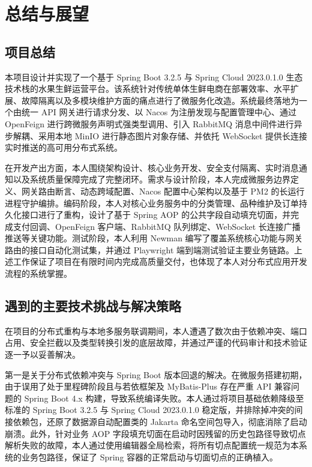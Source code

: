
\chapter{总结与展望}

\section{项目总结}

本项目设计并实现了一个基于 Spring Boot 3.2.5 与 Spring Cloud 2023.0.1.0 生态技术栈的水果生鲜运营平台。该系统针对传统单体生鲜电商在部署效率、水平扩展、故障隔离以及多模块维护方面的痛点进行了微服务化改造。系统最终落地为一个由统一 API 网关进行请求分发、以 Nacos 为注册发现与配置管理中心、通过 OpenFeign 进行跨微服务声明式强类型调用、引入 RabbitMQ 消息中间件进行异步解耦、采用本地 MinIO 进行静态图片对象存储、并依托 WebSocket 提供长连接实时推送的高可用分布式系统。

在开发产出方面，本人围绕架构设计、核心业务开发、安全支付隔离、实时消息通知以及系统质量保障完成了完整闭环。需求与设计阶段，本人完成微服务边界定义、网关路由断言、动态跨域配置、Nacos 配置中心架构以及基于 PM2 的长运行进程守护编排。编码阶段，本人对核心业务服务中的分类管理、品种维护及订单持久化接口进行了重构，设计了基于 Spring AOP 的公共字段自动填充切面，并完成支付回调、OpenFeign 客户端、RabbitMQ 队列绑定、WebSocket 长连接广播推送等关键功能。测试阶段，本人利用 Newman 编写了覆盖系统核心功能与网关路由的接口自动化测试集，并通过 Playwright 端到端测试验证主要业务链路。上述工作保证了项目在有限时间内完成高质量交付，也体现了本人对分布式应用开发流程的系统掌握。

\section{遇到的主要技术挑战与解决策略}

在项目的分布式重构与本地多服务联调期间，本人遭遇了数次由于依赖冲突、端口占用、安全拦截以及类型转换引发的底层故障，并通过严谨的代码审计和技术验证逐一予以妥善解决。

第一是关于分布式依赖冲突与 Spring Boot 版本回退的解决。在微服务搭建初期，由于误用了处于里程碑阶段且与若依框架及 MyBatis-Plus 存在严重 API 兼容问题的 Spring Boot 4.x 构建，导致系统编译失败。本人通过将项目基础依赖降级至标准的 Spring Boot 3.2.5 与 Spring Cloud 2023.0.1.0 稳定版，并排除掉冲突的间接依赖包，还原了数据源自动配置类的 Jakarta 命名空间包导入，彻底消除了启动崩溃。此外，针对业务 AOP 字段填充切面在启动时因残留的历史包路径导致切点解析失败的故障，本人通过使用编辑器全局检索，将所有切点配置统一规范为本系统的业务包路径，保证了 Spring 容器的正常启动与切面切点的正确植入。

